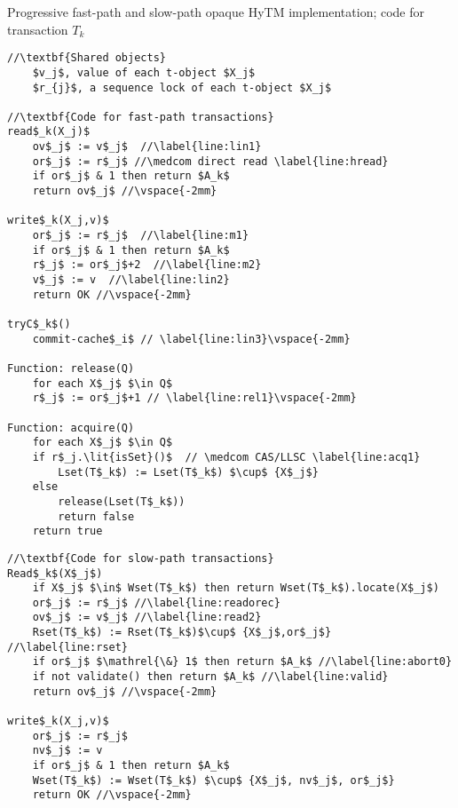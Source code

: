\begin{algorithm*}[!t]
\caption{Progressive fast-path and slow-path opaque HyTM implementation; code for transaction $T_k$}
\label{alg:inswrite}
\vspace{-2mm}
\noindent\lstset{style=customc}
\begin{minipage}{0.49\textwidth}
\begin{lstlisting}[frame=none,firstnumber=1,mathescape=true]
//\textbf{Shared objects}
    $v_j$, value of each t-object $X_j$ 
    $r_{j}$, a sequence lock of each t-object $X_j$

//\textbf{Code for fast-path transactions}
read$_k(X_j)$
    ov$_j$ := v$_j$  //\label{line:lin1}
    or$_j$ := r$_j$ //\medcom direct read \label{line:hread}
    if or$_j$ & 1 then return $A_k$ 
    return ov$_j$ //\vspace{-2mm}

write$_k(X_j,v)$
    or$_j$ := r$_j$  //\label{line:m1}
    if or$_j$ & 1 then return $A_k$
    r$_j$ := or$_j$+2  //\label{line:m2}
    v$_j$ := v  //\label{line:lin2} 
    return OK //\vspace{-2mm}

tryC$_k$()
    commit-cache$_i$ // \label{line:lin3}\vspace{-2mm}

Function: release(Q)
    for each X$_j$ $\in Q$
	r$_j$ := or$_j$+1 // \label{line:rel1}\vspace{-2mm}
	
Function: acquire(Q)
    for each X$_j$ $\in Q$	
	if r$_j.\lit{isSet}()$  // \medcom CAS/LLSC \label{line:acq1}
	    Lset(T$_k$) := Lset(T$_k$) $\cup$ {X$_j$}
	else
	    release(Lset(T$_k$))
	    return false
    return true
\end{lstlisting}
\end{minipage}
\begin{minipage}{0.49\textwidth}
\begin{lstlisting}[frame=none,firstnumber=last,mathescape=true]
//\textbf{Code for slow-path transactions}
Read$_k$(X$_j$)
    if X$_j$ $\in$ Wset(T$_k$) then	return Wset(T$_k$).locate(X$_j$) 
    or$_j$ := r$_j$ //\label{line:readorec}
    ov$_j$ := v$_j$ //\label{line:read2}
    Rset(T$_k$) := Rset(T$_k$)$\cup$ {X$_j$,or$_j$} //\label{line:rset}
    if or$_j$ $\mathrel{\&} 1$ then return $A_k$ //\label{line:abort0}	
    if not validate() then return $A_k$ //\label{line:valid}
    return ov$_j$ //\vspace{-2mm}

write$_k(X_j,v)$
    or$_j$ := r$_j$
    nv$_j$ := v
    if or$_j$ & 1 then return $A_k$
    Wset(T$_k$) := Wset(T$_k$) $\cup$ {X$_j$, nv$_j$, or$_j$}
    return OK //\vspace{-2mm}


\end{lstlisting}
\end{minipage}
\end{algorithm*}
